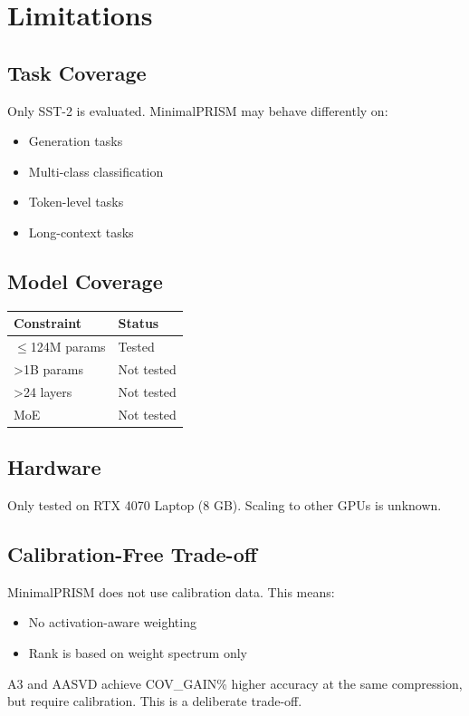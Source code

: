 
\section{Limitations}

\subsection{Task Coverage}

Only SST-2 is evaluated. MinimalPRISM may behave differently on:
\begin{itemize}
\item Generation tasks
\item Multi-class classification
\item Token-level tasks
\item Long-context tasks

\end{itemize}
\subsection{Model Coverage}

\begin{table}[H]
\centering
\small
\begin{tabular}{ll}
\toprule
\textbf{Constraint} & \textbf{Status} \\
\midrule
$\le$124M params & Tested \\
>1B params & Not tested \\
>24 layers & Not tested \\
MoE & Not tested \\
\bottomrule
\end{tabular}
\end{table}

\subsection{Hardware}

Only tested on RTX 4070 Laptop (8 GB). Scaling to other GPUs is unknown.

\subsection{Calibration-Free Trade-off}

MinimalPRISM does not use calibration data. This means:
\begin{itemize}
\item No activation-aware weighting
\item Rank is based on weight spectrum only

\end{itemize}
A3 and AASVD achieve {{COV\_GAIN}}\% higher accuracy at the same compression, 
but require calibration. This is a deliberate trade-off.

